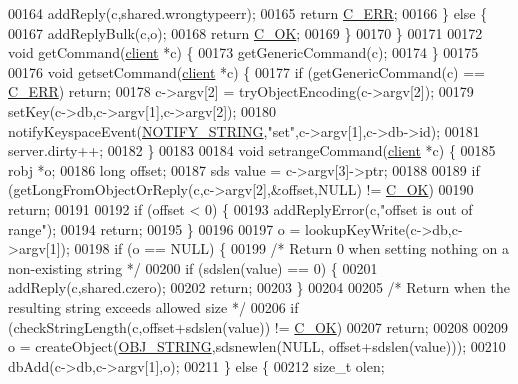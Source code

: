 \begin{DoxyCode}
{00164         addReply(c,shared.wrongtypeerr);
00165         \textcolor{keywordflow}{return} \hyperlink{server_8h_af98ac28d5f4d23d7ed5985188e6fb7d1}{C\_ERR};
00166     \} \textcolor{keywordflow}{else} \{
00167         addReplyBulk(c,o);
00168         \textcolor{keywordflow}{return} \hyperlink{server_8h_a303769ef1065076e68731584e758d3e1}{C\_OK};
00169     \}
00170 \}
00171 
00172 \textcolor{keywordtype}{void} getCommand(\hyperlink{structclient}{client} *c) \{
00173     getGenericCommand(c);
00174 \}
00175 
00176 \textcolor{keywordtype}{void} getsetCommand(\hyperlink{structclient}{client} *c) \{
00177     \textcolor{keywordflow}{if} (getGenericCommand(c) == \hyperlink{server_8h_af98ac28d5f4d23d7ed5985188e6fb7d1}{C\_ERR}) \textcolor{keywordflow}{return};
00178     c->argv[2] = tryObjectEncoding(c->argv[2]);
00179     setKey(c->db,c->argv[1],c->argv[2]);
00180     notifyKeyspaceEvent(\hyperlink{server_8h_a1902292b73b71baa65d86db2d61b47ce}{NOTIFY\_STRING},\textcolor{stringliteral}{"set"},c->argv[1],c->db->id);
00181     server.dirty++;
00182 \}
00183 
00184 \textcolor{keywordtype}{void} setrangeCommand(\hyperlink{structclient}{client} *c) \{
00185     robj *o;
00186     \textcolor{keywordtype}{long} offset;
00187     sds value = c->argv[3]->ptr;
00188 
00189     \textcolor{keywordflow}{if} (getLongFromObjectOrReply(c,c->argv[2],&offset,NULL) != \hyperlink{server_8h_a303769ef1065076e68731584e758d3e1}{C\_OK})
00190         \textcolor{keywordflow}{return};
00191 
00192     \textcolor{keywordflow}{if} (offset < 0) \{
00193         addReplyError(c,\textcolor{stringliteral}{"offset is out of range"});
00194         \textcolor{keywordflow}{return};
00195     \}
00196 
00197     o = lookupKeyWrite(c->db,c->argv[1]);
00198     \textcolor{keywordflow}{if} (o == NULL) \{
00199         \textcolor{comment}{/* Return 0 when setting nothing on a non-existing string */}
00200         \textcolor{keywordflow}{if} (sdslen(value) == 0) \{
00201             addReply(c,shared.czero);
00202             \textcolor{keywordflow}{return};
00203         \}
00204 
00205         \textcolor{comment}{/* Return when the resulting string exceeds allowed size */}
00206         \textcolor{keywordflow}{if} (checkStringLength(c,offset+sdslen(value)) != \hyperlink{server_8h_a303769ef1065076e68731584e758d3e1}{C\_OK})
00207             \textcolor{keywordflow}{return};
00208 
00209         o = createObject(\hyperlink{server_8h_a65236ea160f69cdef33ec942092af88f}{OBJ\_STRING},sdsnewlen(NULL, offset+sdslen(value)));
00210         dbAdd(c->db,c->argv[1],o);
00211     \} \textcolor{keywordflow}{else} \{
00212         size\_t olen;
}
\end{DoxyCode}
